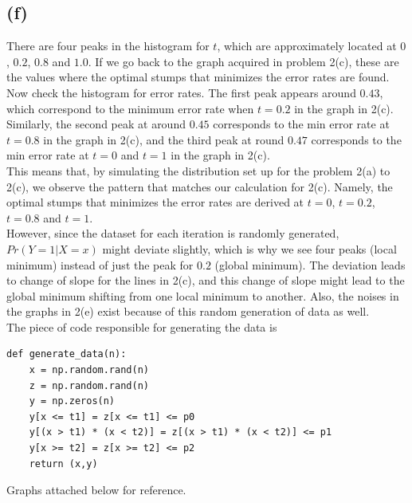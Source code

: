 \documentclass[11pt]{article}
\begin{document}
\subsection*{(f)}
There are four peaks in the histogram for $t$, which are approximately located at $0$, $0.2$, $0.8$ and $1.0$. If we go back to the graph acquired in problem 2(c), these are the values where the optimal stumps that minimizes the error rates are found. \\
Now check the histogram for error rates. The first peak appears around $0.43$, which correspond to the minimum error rate when $t=0.2$ in the graph in 2(c). Similarly, the second peak at around $0.45$ corresponds to the min error rate at $t=0.8$ in the graph in 2(c), and the third peak at round $0.47$ corresponds to the min error rate at $t=0$ and $t=1$ in the graph in 2(c). \\
This means that, by simulating the distribution set up for the problem 2(a) to 2(c), we observe the pattern that matches our calculation for 2(c). Namely, the optimal stumps that minimizes the error rates are derived at $t=0$, $t=0.2$, $t=0.8$ and $t=1$. \\
However, since the dataset for each iteration is randomly generated, $Pr(Y=1|X=x)$ might deviate slightly, which is why we see four peaks (local minimum) instead of just the peak for $0.2$ (global minimum). The deviation leads to change of slope for the lines in 2(c), and this change of slope might lead to the global minimum shifting from one local minimum to another. Also, the noises in the graphs in 2(e) exist because of this random generation of data as well. \\
The piece of code responsible for generating the data is
\begin{verbatim}
def generate_data(n):
    x = np.random.rand(n)
    z = np.random.rand(n)
    y = np.zeros(n)
    y[x <= t1] = z[x <= t1] <= p0
    y[(x > t1) * (x < t2)] = z[(x > t1) * (x < t2)] <= p1
    y[x >= t2] = z[x >= t2] <= p2
    return (x,y)
\end{verbatim}
Graphs attached below for reference.
\end{document}
